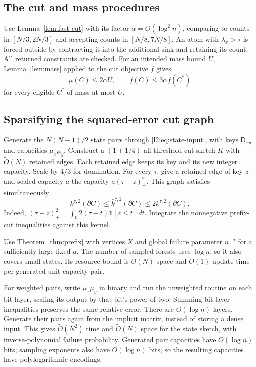 \documentclass[11pt]{article}
\theoremstyle{definition}
\newcommand{\ind}{\mathbf 1}
\newcommand{\wt}{\widetilde}
\newcommand{\cut}{\partial}
\begin{document}
\subsection{The cut and mass procedures}
Use Lemma~\ref{lem:fast-cut} with its factor $\alpha=O(\log^2 n)$,
comparing to counts in $[N/3,2N/3]$ and accepting counts in $[N/8,7N/8]$.
An atom with $\lambda_x>\tau$ is forced outside by contracting it into the
additional sink and retaining its count. All returned constraints are checked.
For an intended mass bound $U$, Lemma~\ref{lem:mass} applied to the cut
objective $f$ gives
\begin{equation}\label{l2:eq:mass-penalty}
 \mu(C)\le2\alpha U,\qquad f(C)\le3\alpha f(C^*)
\end{equation}
for every eligible $C^*$ of mass at most $U$.

\subsection{Sparsifying the squared-error cut graph}

Generate the $N(N-1)/2$ state pairs through \eqref{l2:eq:state-input},
with keys $\mathsf D_{xy}$ and capacities $\mu_x\mu_y$.
Construct a $(1\pm1/4)$ all-threshold cut sketch $K$ with
$\wt O(N)$ retained edges. Each retained edge keeps its key and its
new integer capacity. Scale by $4/3$ for domination.
For every $\tau$, give a retained edge of key $z$ and scaled capacity
$a$ the capacity $a(\tau-z)_+^2$. This graph satisfies simultaneously
\begin{equation}\label{l2:eq:hinge-sketch}
 k^{\tau,2}(\cut C)\le\bar k^{\tau,2}(\cut C)\le2k^{\tau,2}(\cut C).
\end{equation}
Indeed,
$(\tau-z)_+^2=\int_0^\tau2(\tau-t)\ind[z\le t]\,dt$.
Integrate the nonnegative prefix-cut inequalities against this kernel.

Use Theorem~\ref{thm:prefix} with vertices $X$ and global failure
parameter $n^{-a}$ for a sufficiently large fixed $a$. The number of
sampled forests uses $\log n$, so it also covers small states. Its
resource bound is $\widetilde O(N)$ space and $\widetilde O(1)$ update
time per generated unit-capacity pair.

For weighted pairs, write $\mu_x\mu_y$ in binary and run the unweighted
routine on each bit layer, scaling its output by that bit's power of
two. Summing bit-layer inequalities preserves the same relative error.
There are $O(\log n)$ layers. Generate their pairs again from the
implicit matrix, instead of storing a dense input. This gives
$\wt O(N^2)$ time and $\wt O(N)$ space for the state sketch, with
inverse-polynomial failure probability. Generated pair capacities have $O(\log n)$ bits; sampling exponents also have $O(\log n)$ bits, so the resulting capacities have polylogarithmic encodings.
\end{document}
